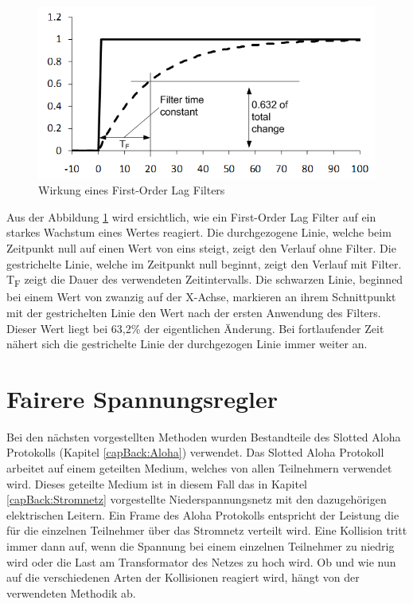 \begin{figure}[htb]
	\includegraphics[scale=0.75]{img/lag_Filter.png}
	\caption{Wirkung eines First-Order Lag Filters}
	\label{Abb_lag_filter}
\end{figure}

Aus der Abbildung \ref{Abb_lag_filter} wird ersichtlich, wie ein First-Order Lag Filter auf ein starkes Wachstum eines Wertes reagiert. Die durchgezogene Linie, welche beim Zeitpunkt null auf einen Wert von eins steigt, zeigt den Verlauf ohne Filter. Die gestrichelte Linie, welche im Zeitpunkt null beginnt, zeigt den Verlauf mit Filter. T\textsubscript{F} zeigt die Dauer des verwendeten Zeitintervalls. Die schwarzen Linie, beginned bei einem Wert von zwanzig auf der X-Achse, markieren an ihrem Schnittpunkt  mit der gestrichelten Linie den Wert nach der ersten Anwendung des Filters. Dieser Wert liegt bei 63,2\% der eigentlichen Änderung. Bei fortlaufender Zeit nähert sich die gestrichelte Linie der durchgezogen Linie immer weiter an.

\section{Fairere Spannungsregler}
Bei den nächsten vorgestellten Methoden wurden Bestandteile des Slotted Aloha Protokolls (Kapitel \ref{capBack:Aloha}) verwendet. Das Slotted Aloha Protokoll arbeitet auf einem geteilten Medium, welches von allen Teilnehmern verwendet wird. Dieses geteilte Medium ist in diesem Fall das in Kapitel \ref{capBack:Stromnetz} vorgestellte Niederspannungsnetz mit den dazugehörigen elektrischen Leitern. Ein Frame des Aloha Protokolls entspricht der Leistung die für die einzelnen Teilnehmer über das Stromnetz verteilt wird. Eine Kollision tritt immer dann auf, wenn die Spannung bei einem einzelnen Teilnehmer zu niedrig wird oder die Last am Transformator des Netzes zu hoch wird. Ob und wie nun auf die verschiedenen Arten der Kollisionen reagiert wird, hängt von der verwendeten Methodik ab.
